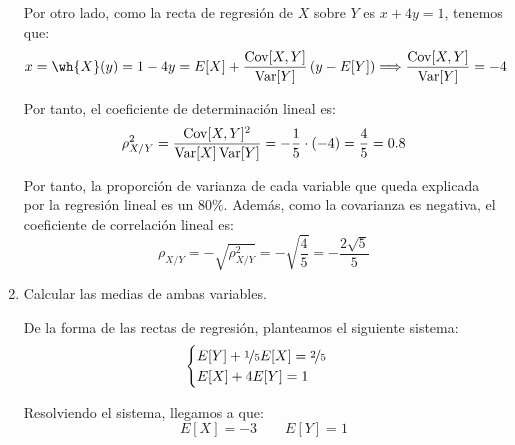 \begin{ejercicio}
\begin{enumerate}
        Por otro lado, como la recta de regresión de $X$ sobre $Y$ es $x+4y=1$, tenemos que:
        \begin{equation*}
            x=\wh{X}(y) = 1-4y = E[X] + \dfrac{\Cov[X,Y]}{\Var[Y]}\left(y-E[Y]\right)
            \Longrightarrow
            \dfrac{\Cov[X,Y]}{\Var[Y]} = -4
        \end{equation*}

        Por tanto, el coeficiente de determinación lineal es:
        \begin{equation*}
            \rho_{X/Y}^2 = \dfrac{\operatorname{Cov}[X,Y]^2}{\operatorname{Var}[X]\operatorname{Var}[Y]} = -\dfrac{1}{5}\cdot (-4) = \dfrac{4}{5} = 0.8
        \end{equation*}

        Por tanto, la proporción de varianza de cada variable que queda explicada por la regresión lineal es un $80\%$. Además, como la covarianza es negativa, el coeficiente de correlación lineal es:
        \begin{equation*}
            \rho_{X/Y} = -\sqrt{\rho_{X/Y}^2} = -\sqrt{\dfrac{4}{5}} = -\dfrac{2\sqrt{5}}{5}
        \end{equation*}

        \item Calcular las medias de ambas variables.
        
        De la forma de las rectas de regresión, planteamos el siguiente sistema:
        \begin{equation*}
            \begin{cases}
                E[Y] +\nicefrac{1}{5}E[X] = \nicefrac{2}{5}\\
                E[X] +4E[Y] = 1
            \end{cases}
        \end{equation*}

        Resolviendo el sistema, llegamos a que:
        \begin{equation*}
            E[X]=-3 \qquad E[Y]=1
        \end{equation*}
    \end{enumerate}
\end{ejercicio}